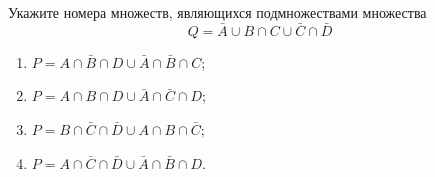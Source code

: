\question
Укажите номера множеств, являющихся подмножествами множества
\begin{equation*}
	Q = \bar{A} \cup B \cap C \cup \bar{C} \cap \bar{D}
\end{equation*}

\begin{enumerate}
	\renewcommand{\labelenumi}{\arabic{enumi})}
	\item $P = A \cap \bar{B} \cap D \cup \bar{A} \cap \bar{B} \cap C$;
	\item $P = A \cap B \cap D \cup \bar{A} \cap \bar{C} \cap D$;
	\item $P = B \cap \bar{C} \cap \bar{D} \cup A \cap B \cap \bar{C}$;
	\item $P = A \cap \bar{C} \cap \bar{D} \cup \bar{A} \cap \bar{B} \cap D$.
\end{enumerate}
